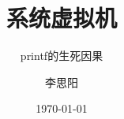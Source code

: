 \documentclass[compress,xcolor=svgnames,table,12pt]{beamer}
\title[系统虚拟机]{系统虚拟机}
\subtitle{\kai printf的生死因果}
\author{\kai 李思阳}
\date{\today}
\institute{国防科学技术大学\\
  \vspace{-0.2em}{\small 计算机学院} }
\begin{document}
\begin{frame}[plain]
\titlepage
\end{frame}


\end{document}
